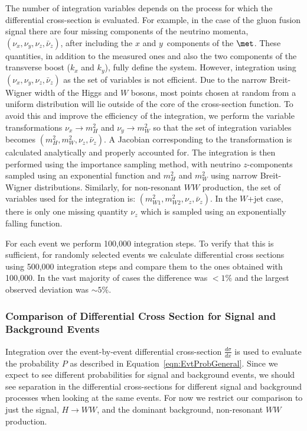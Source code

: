 The number of integration variables depends on the process for which the differential cross-section is evaluated. For example,
in the case of the gluon fusion signal there are four missing components of the neutrino momenta,
$(\nu_{x}, \nu_{y}, \nu_{z}, \bar{\nu}_{z})$, after including the $x$ and $y$~components of the $\met$.  
These quantities, in addition to the measured ones and also the two components of the transverse boost 
($k_{x}$ and $k_{y}$), fully define the system.
However, integration using  $(\nu_{x}, \nu_{y}, \nu_{z}, \bar{\nu}_{z})$ as the set of variables is not efficient.  Due to the narrow 
Breit-Wigner width of the Higgs and $W$ bosons, most points chosen at random from a uniform distribution will lie outside of 
the core of the cross-section function. To avoid this and improve the
efficiency of the integration, we perform the variable transformations 
$\nu_{x} \rightarrow m_{H}^{2}$ and $\nu_{y} \rightarrow m_{W}^{2}$ 
so that the set of integration variables becomes $(m_{H}^{2}, m_{W}^{2}, \nu_{z}, \bar{\nu}_{z})$.
A Jacobian corresponding to the transformation is calculated analytically and properly 
accounted for. The integration is then performed using the importance sampling method, with neutrino $z$-components sampled
using an exponential function and $m_{H}^{2}$ and $m_{W}^{2}$ using narrow Breit-Wigner distributions.
Similarly, for non-resonant $WW$ production, the set of variables used for the integration is:
$(m_{W1}^{2}, m_{W2}^{2}, \nu_{z}, \bar{\nu}_{z})$. In the $W$+jet case, there is only one missing quantity $\nu_{z}$ which is sampled using 
an exponentially falling function.

For each event we perform 100,000 integration steps. To verify that this is sufficient, for randomly selected events we calculate differential cross
sections using 500,000 integration steps and compare them to the ones obtained with 100,000. In the vast majority of cases the difference
was $< 1\%$ and the largest observed deviation was $\sim 5\%$. 

\subsubsection{Comparison of Differential Cross Section for Signal and Background Events}

Integration over the event-by-event differential cross-section $\frac{d\sigma}{dx}$ is used to evaluate the probability $P$ as described
in Equation~\ref{eqn:EvtProbGeneral}.  Since we expect to see different probabilities for signal and background events,
we should see separation in the differential cross-sections for different signal and
background processes when looking at the same events.  For now we restrict our comparison to just the signal,
$H\rightarrow WW$, and the dominant background, non-resonant $WW$ production.

